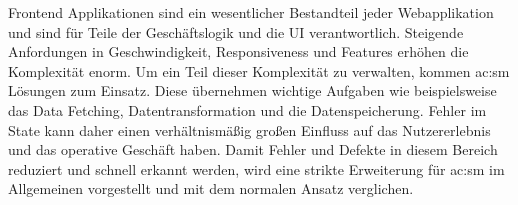 Frontend Applikationen sind ein wesentlicher Bestandteil jeder Webapplikation und sind für Teile der Geschäftslogik und die UI verantwortlich. Steigende Anfordungen in Geschwindigkeit, Responsiveness und Features erhöhen die Komplexität enorm. Um ein Teil dieser Komplexität zu verwalten, kommen \acrlong{ac:sm} Lösungen zum Einsatz. Diese übernehmen wichtige Aufgaben wie beispielsweise das Data Fetching, Datentransformation und die Datenspeicherung. Fehler im State kann daher einen verhältnismäßig großen Einfluss auf das Nutzererlebnis und das operative Geschäft haben. Damit Fehler und Defekte in diesem Bereich reduziert und schnell erkannt werden, wird eine strikte Erweiterung für \acrlong{ac:sm} im Allgemeinen vorgestellt und mit dem normalen Ansatz verglichen.